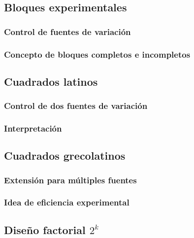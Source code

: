 \documentclass[
  oneside]{book}
\begin{document}
\subsection{Bloques experimentales}\label{bloques-experimentales}

\subsubsection{Control de fuentes de variación}\label{control-de-fuentes-de-variaciuxf3n}

\subsubsection{Concepto de bloques completos e incompletos}\label{concepto-de-bloques-completos-e-incompletos}

\subsection{Cuadrados latinos}\label{cuadrados-latinos}

\subsubsection{Control de dos fuentes de variación}\label{control-de-dos-fuentes-de-variaciuxf3n}

\subsubsection{Interpretación}\label{interpretaciuxf3n-1}

\subsection{Cuadrados grecolatinos}\label{cuadrados-grecolatinos}

\subsubsection{Extensión para múltiples fuentes}\label{extensiuxf3n-para-muxfaltiples-fuentes}

\subsubsection{Idea de eficiencia experimental}\label{idea-de-eficiencia-experimental}

\subsection{\texorpdfstring{Diseño factorial \(2^k\)}{Diseño factorial 2\^{}k}}\label{diseuxf1o-factorial-2k}
\end{document}
